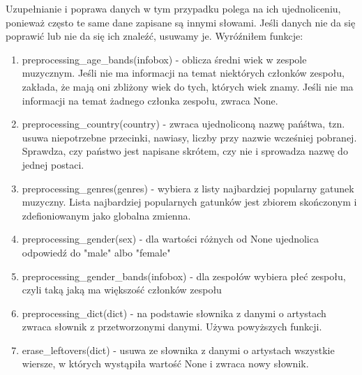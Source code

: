 \documentclass[12pt, letterpaper]{article}
\begin{document}
Uzupełnianie i poprawa danych w tym przypadku polega na ich ujednoliceniu, ponieważ często te same dane zapisane są innymi słowami. Jeśli danych nie da się poprawić lub nie da się ich znaleźć, usuwamy je. Wyróźniłem funkcje:
\begin{enumerate}
    \item preprocessing\_age\_bands(infobox) - oblicza średni wiek w zespole muzycznym. Jeśli nie ma informacji na temat niektórych członków zespołu, zakłada, że mają oni zbliżony wiek do tych, których wiek znamy. Jeśli nie ma informacji na temat żadnego członka zespołu, zwraca None.
    \item preprocessing\_country(country) - zwraca ujednoliconą nazwę pańśtwa, tzn. usuwa niepotrzebne przecinki, nawiasy, liczby przy nazwie wcześniej pobranej. Sprawdza, czy państwo jest napisane skrótem, czy nie i sprowadza nazwę do jednej postaci.
    \item preprocessing\_genres(genres) - wybiera z listy najbardziej popularny gatunek muzyczny. Lista najbardziej popularnych gatunków jest zbiorem skończonym i zdefioniowanym jako globalna zmienna.
    \item preprocessing\_gender(sex) - dla wartości różnych od None ujednolica odpowiedź do "male" albo "female"
    \item preprocessing\_gender\_bands(infobox) - dla zespołów wybiera płeć zespołu, czyli taką jaką ma większość członków zespołu
    \item preprocessing\_dict(dict) - na podstawie słownika z danymi o artystach zwraca słownik z przetworzonymi danymi. Używa powyższych funkcji.
    \item erase\_leftovers(dict) - usuwa ze słownika z danymi o artystach wszystkie wiersze, w których wystąpiła wartość None i zwraca nowy słownik.
\end{enumerate}
\end{document}
